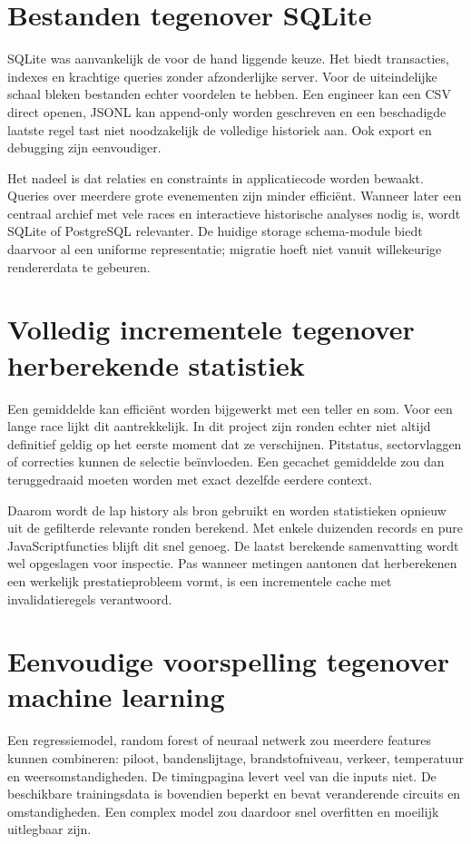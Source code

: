 \section{Bestanden tegenover SQLite}
SQLite was aanvankelijk de voor de hand liggende keuze. Het biedt transacties, indexes en krachtige queries zonder afzonderlijke server. Voor de uiteindelijke schaal bleken bestanden echter voordelen te hebben. Een engineer kan een CSV direct openen, JSONL kan append-only worden geschreven en een beschadigde laatste regel tast niet noodzakelijk de volledige historiek aan. Ook export en debugging zijn eenvoudiger.

Het nadeel is dat relaties en constraints in applicatiecode worden bewaakt. Queries over meerdere grote evenementen zijn minder efficiënt. Wanneer later een centraal archief met vele races en interactieve historische analyses nodig is, wordt SQLite of PostgreSQL relevanter. De huidige storage schema-module biedt daarvoor al een uniforme representatie; migratie hoeft niet vanuit willekeurige rendererdata te gebeuren.

\section{Volledig incrementele tegenover herberekende statistiek}
Een gemiddelde kan efficiënt worden bijgewerkt met een teller en som. Voor een lange race lijkt dit aantrekkelijk. In dit project zijn ronden echter niet altijd definitief geldig op het eerste moment dat ze verschijnen. Pitstatus, sectorvlaggen of correcties kunnen de selectie beïnvloeden. Een gecachet gemiddelde zou dan teruggedraaid moeten worden met exact dezelfde eerdere context.

Daarom wordt de lap history als bron gebruikt en worden statistieken opnieuw uit de gefilterde relevante ronden berekend. Met enkele duizenden records en pure JavaScriptfuncties blijft dit snel genoeg. De laatst berekende samenvatting wordt wel opgeslagen voor inspectie. Pas wanneer metingen aantonen dat herberekenen een werkelijk prestatieprobleem vormt, is een incrementele cache met invalidatieregels verantwoord.

\section{Eenvoudige voorspelling tegenover machine learning}
Een regressiemodel, random forest of neuraal netwerk zou meerdere features kunnen combineren: piloot, bandenslijtage, brandstofniveau, verkeer, temperatuur en weersomstandigheden. De timingpagina levert veel van die inputs niet. De beschikbare trainingsdata is bovendien beperkt en bevat veranderende circuits en omstandigheden. Een complex model zou daardoor snel overfitten en moeilijk uitlegbaar zijn.

